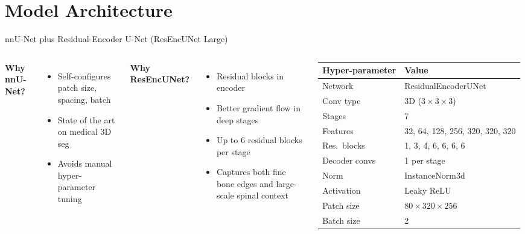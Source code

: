 \documentclass[aspectratio=169,11pt]{beamer}
\begin{document}
\section{Model Architecture}

\begin{frame}{nnU-Net plus Residual-Encoder U-Net (ResEncUNet Large)}
  \begin{columns}[T,onlytextwidth]
    \textbf{Why nnU-Net?}
    \begin{itemize}
      \item Self-configures patch size, spacing, batch
      \item State of the art on medical 3D seg
      \item Avoids manual hyper-parameter tuning
    \end{itemize}
    \vspace{0.5em}
    \textbf{Why ResEncUNet?}
    \begin{itemize}
      \item Residual blocks in encoder
      \item Better gradient flow in deep stages
      \item Up to 6 residual blocks per stage
      \item Captures both fine bone edges and large-scale spinal context
    \end{itemize}

    \footnotesize
    \begin{tabular}{ll}
      \toprule
      \textbf{Hyper-parameter} & \textbf{Value} \\ \midrule
      Network        & ResidualEncoderUNet \\
      Conv type      & 3D ($3\times3\times3$) \\
      Stages         & 7 \\
      Features       & 32, 64, 128, 256, 320, 320, 320 \\
      Res.\ blocks   & 1, 3, 4, 6, 6, 6, 6 \\
      Decoder convs  & 1 per stage \\
      Norm           & InstanceNorm3d \\
      Activation     & Leaky ReLU \\
      Patch size     & $80 \times 320 \times 256$ \\
      Batch size     & 2 \\
      \bottomrule
    \end{tabular}
  \end{columns}
\end{frame}
\end{document}
